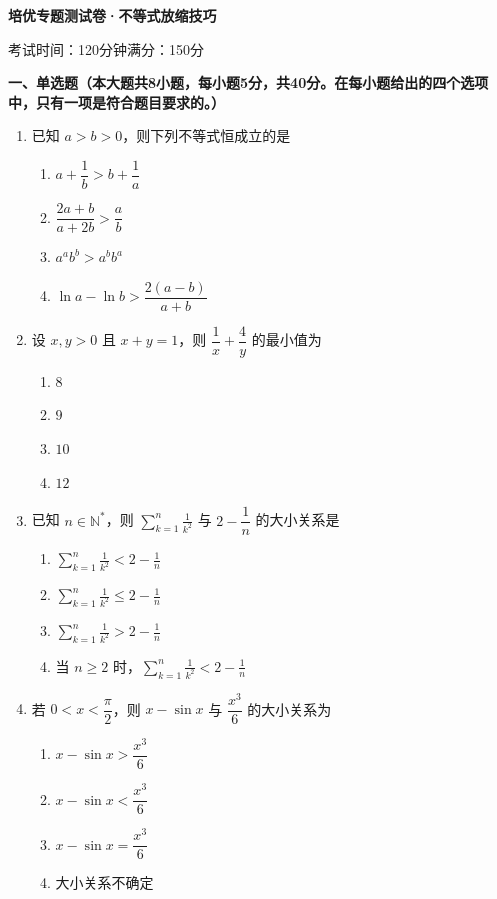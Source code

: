 \documentclass[12pt, a4paper]{ctexart}
\newcommand{\score}[1]{\hfill\makebox[2cm][l]{(#1分)}}
\begin{document}
\begin{center}
\Large\textbf{培优专题测试卷·不等式放缩技巧}

\normalsize
考试时间：120分钟\quad 满分：150分
\end{center}

\vspace{0.5cm}

\noindent\textbf{一、单选题（本大题共8小题，每小题5分，共40分。在每小题给出的四个选项中，只有一项是符合题目要求的。）}

\vspace{0.3cm}

\begin{enumerate}
\item 已知 $a > b > 0$，则下列不等式恒成立的是\score{5}
\begin{enumerate}[label=\Alph*.]
\item $a + \dfrac{1}{b} > b + \dfrac{1}{a}$
\item $\dfrac{2a+b}{a+2b} > \dfrac{a}{b}$
\item $a^a b^b > a^b b^a$
\item $\ln a - \ln b > \dfrac{2(a-b)}{a+b}$
\end{enumerate}

\item 设 $x, y > 0$ 且 $x + y = 1$，则 $\dfrac{1}{x} + \dfrac{4}{y}$ 的最小值为\score{5}
\begin{enumerate}[label=\Alph*.]
\item $8$
\item $9$
\item $10$
\item $12$
\end{enumerate}

\item 已知 $n \in \mathbb{N}^*$，则 $\displaystyle\sum_{k=1}^{n} \frac{1}{k^2}$ 与 $2 - \dfrac{1}{n}$ 的大小关系是\score{5}
\begin{enumerate}[label=\Alph*.]
\item $\displaystyle\sum_{k=1}^{n} \frac{1}{k^2} < 2 - \frac{1}{n}$
\item $\displaystyle\sum_{k=1}^{n} \frac{1}{k^2} \leqslant 2 - \frac{1}{n}$
\item $\displaystyle\sum_{k=1}^{n} \frac{1}{k^2} > 2 - \frac{1}{n}$
\item 当 $n \geqslant 2$ 时，$\displaystyle\sum_{k=1}^{n} \frac{1}{k^2} < 2 - \frac{1}{n}$
\end{enumerate}

\item 若 $0 < x < \dfrac{\pi}{2}$，则 $x - \sin x$ 与 $\dfrac{x^3}{6}$ 的大小关系为\score{5}
\begin{enumerate}[label=\Alph*.]
\item $x - \sin x > \dfrac{x^3}{6}$
\item $x - \sin x < \dfrac{x^3}{6}$
\item $x - \sin x = \dfrac{x^3}{6}$
\item 大小关系不确定
\end{enumerate}


\end{enumerate}
\end{document}
